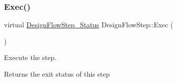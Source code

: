\mbox{\label{classDesignFlowStep_a77d7e38493016766098711ea24f60b89}} 
\subsubsection{\texorpdfstring{Exec()}{Exec()}}
{\footnotesize\ttfamily virtual \hyperlink{design__flow__step_8hpp_afb1f0d73069c26076b8d31dbc8ebecdf}{Design\+Flow\+Step\+\_\+\+Status} Design\+Flow\+Step\+::\+Exec (\begin{DoxyParamCaption}{ }\end{DoxyParamCaption})\hspace{0.3cm}{\ttfamily [pure virtual]}}



Execute the step. 

\begin{DoxyReturn}{Returns}
the exit status of this step 
\end{DoxyReturn}


